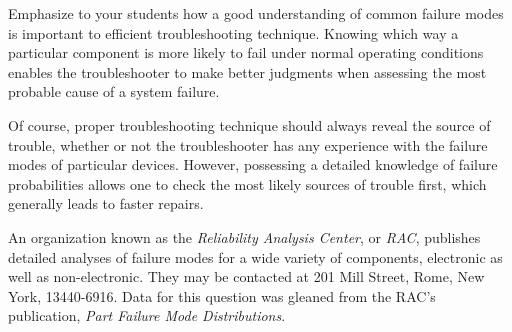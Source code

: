 





Emphasize to your students how a good understanding of common failure modes is important to efficient troubleshooting technique.  Knowing which way a particular component is more likely to fail under normal operating conditions enables the troubleshooter to make better judgments when assessing the most probable cause of a system failure.  

Of course, proper troubleshooting technique should always reveal the source of trouble, whether or not the troubleshooter has any experience with the failure modes of particular devices.  However, possessing a detailed knowledge of failure probabilities allows one to check the most likely sources of trouble first, which generally leads to faster repairs.

An organization known as the {\it Reliability Analysis Center}, or {\it RAC}, publishes detailed analyses of failure modes for a wide variety of components, electronic as well as non-electronic.  They may be contacted at 201 Mill Street, Rome, New York, 13440-6916.  Data for this question was gleaned from the RAC's publication, {\it Part Failure Mode Distributions}.




